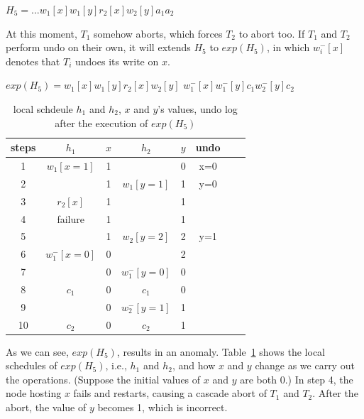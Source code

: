 \documentclass[conference]{IEEEtran}
\begin{document}
\begin{center}
${H_5 = ...w_1[x]w_1[y]r_2[x]w_2[y]a_1a_2}$
\end{center}

At this moment, ${T_1}$ somehow aborts, which forces ${T_2}$ to abort too.
If ${T_1}$ and ${T_2}$ perform undo on their own, it will extends ${H_5}$ to ${exp(H_5)}$,
in which ${w^-_i[x]}$ denotes that ${T_i}$ undoes its write on ${x}$.

\begin{center}
  ${exp(H_5) =  w_1[x]w_1[y]r_2[x] w_2[y]}$
  ${w^-_1[x]w^-_1[y]  c_1 w^-_2[y]c_2}$
\end{center}


\begin{table}[tbp]
  \centering
  \caption{local schdeule $h_1$ and $h_2$, $x$ and $y$'s values, undo log after the execution of ${exp(H_5)}$}
  \begin{tabular}{|c|c|c|c|c|c|c|c|}
  \hline
steps & $h_1$ & $x$ & $h_2$ & $y$ & undo   \\
  \hline
  \hline
 1& $w_1[x=1]$ & 1 & &  0 & x=0  \\
  \hline
  2& & 1 & $w_1[y=1]$ & 1 & y=0   \\
  \hline
3 & $r_2[x]$ & 1 & & 1 &    \\

  \hline
 4 & failure  & 1 & & 1 &  \\
  \hline
 5& & 1 &   $w_2[y=2]$ & 2 & y=1  \\
  \hline
6  & $w^-_1[x=0]$ & 0 && 2 &   \\
  \hline
7 & & 0 & $w^-_1[y=0]$ & 0 &   \\
  \hline


8  & $c_1$ & 0 &$c_1$& 0 &   \\
  \hline
9 & & 0 &  $w^-_2[y=1]$& 1 &   \\
  \hline
10 & $c_2$ & 0 &$c_2$& 1 &  \\
  \hline
  \end{tabular}

\label{tbl:x_y_vlues}
\end{table}

As we can see, $exp(H_5)$, results in an anomaly.
Table~\ref{tbl:x_y_vlues} shows the local schedules of $exp(H_5)$, i.e., ${h_1}$ and  ${h_2}$, and how ${x}$ and ${y}$ change as we carry out the operations.
(Suppose the initial values of ${x}$ and ${y}$ are both 0.)
In step 4, the node hosting ${x}$ fails and restarts, causing a cascade abort of ${T_1}$ and ${T_2}$.
After the abort, the value of ${y}$ becomes 1, which is incorrect.
\end{document}
